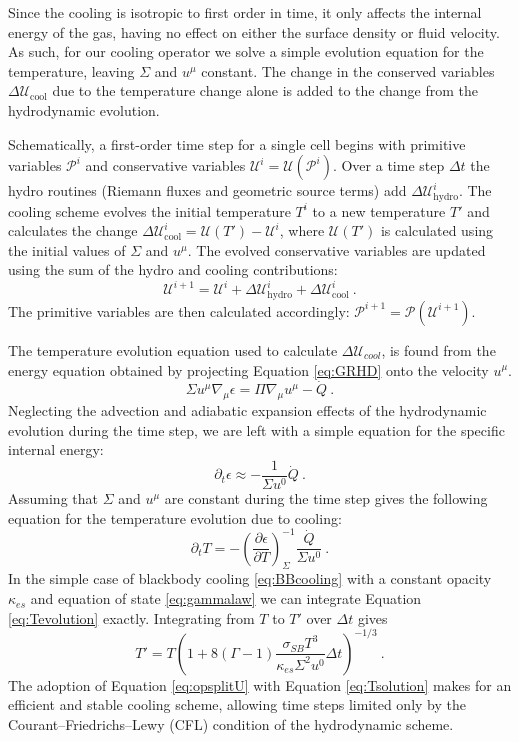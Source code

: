 \documentclass{emulateapj}
\newcommand{\Gam}{\Gamma}
\newcommand{\De}{\Delta}
\newcommand{\eps}{\epsilon}
\newcommand{\sig}{\sigma}
\newcommand{\Sig}{\Sigma}
\newcommand{\ka}{\kappa}
\newcommand{\pd}{\partial}
\begin{document}
Since the cooling is isotropic to first order in time, it only affects the internal energy of the gas, having no effect on either the surface density or fluid velocity.  As such, for our cooling operator we solve a simple evolution equation for the temperature, leaving $\Sig$ and $u^\mu$ constant.  The change in the conserved variables $\De \mathcal{U}_\text{cool}$ due to the temperature change alone is added to the change from the hydrodynamic evolution.

Schematically, a first-order time step for a single cell begins with primitive variables $\mathcal{P}^i$ and conservative variables $\mathcal{U}^i = \mathcal{U}(\mathcal{P}^i)$.  Over a time step $\De t$ the hydro routines (Riemann fluxes and geometric source terms) add $\De \mathcal{U}^i_\text{hydro}$.  The cooling scheme evolves the initial temperature $T^i$ to a new temperature $T'$ and calculates the change $\De \mathcal{U}^i_\text{cool} = \mathcal{U}(T') - \mathcal{U}^i$, where $\mathcal{U}(T')$ is calculated using the initial values of $\Sig$ and $u^\mu$.  The evolved conservative variables are updated using the sum of the hydro and cooling contributions: 
\begin{equation}
	\mathcal{U}^{i+1} = \mathcal{U}^i + \De \mathcal{U}^i_\text{hydro} + \De \mathcal{U}^i_\text{cool} \ . \label{eq:opsplitU}
\end{equation}
The primitive variables are then calculated accordingly: $\mathcal{P}^{i+1} = \mathcal{P}(\mathcal{U}^{i+1})$.

The temperature evolution equation used to calculate $\De \mathcal{U}_{cool}$, is found from the energy equation obtained by projecting Equation \eqref{eq:GRHD} onto the velocity $u^\mu$.
\begin{equation}
	\Sig u^\mu \nabla_\mu \eps = \Pi \nabla_\mu u^\mu - \dot{Q} \ .
\end{equation}
Neglecting the advection and adiabatic expansion effects of the hydrodynamic evolution during the time step, we are left with a simple equation for the specific internal energy:
\begin{equation}
	\pd_t \eps \approx - \frac{1}{\Sig u^0} \dot{Q} \ .
\end{equation}
Assuming that $\Sig$ and $u^\mu$ are constant during the time step gives the following equation for the temperature evolution due to cooling:
\begin{equation}
	\pd_t T = - \left(\frac{\pd \eps}{\pd T}\right)_{\Sig}^{-1} \frac{\dot{Q}}{\Sig u^0} \ . \label{eq:Tevolution}
\end{equation}
In the simple case of blackbody cooling \eqref{eq:BBcooling} with a constant opacity $\ka_{es}$ and equation of state \eqref{eq:gammalaw} we can integrate Equation \eqref{eq:Tevolution} exactly.  Integrating from $T$ to $T'$ over $\De t$ gives
\begin{equation}
	T' = T \left( 1 + 8 (\Gam-1) \frac{\sig_{SB} T^3}{\ka_{es}\Sig^2 u^0} \De t \right)^{-1/3} \ . \label{eq:Tsolution}
\end{equation}
The adoption of Equation \eqref{eq:opsplitU} with Equation \eqref{eq:Tsolution} makes for an efficient and stable cooling scheme, allowing time steps limited only by the Courant--Friedrichs--Lewy (CFL) condition of the hydrodynamic scheme.
\end{document}
